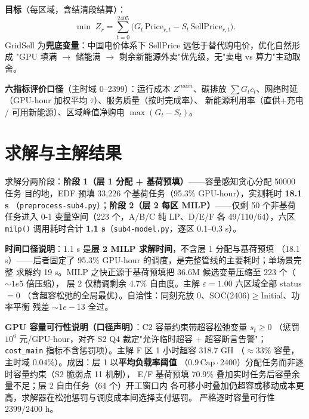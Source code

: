 \documentclass{internal-report}
\begin{document}
\textbf{目标}（每区域，含结清段结算）：
\begin{equation}
  \min\; Z_r = \sum_{t=0}^{2405}\big( G_t\,\text{Price}_{r,t} - S_t\,\text{SellPrice}_{r,t} \big).
  \label{eq:obj}
\end{equation}
GridSell 为\textbf{兜底变量}：中国电价体系下 SellPrice 远低于替代购电价，优化自然形成
"GPU 填满 $\to$ 储能满 $\to$ 剩余新能源外卖"优先级，无"卖电 vs 算力"主动取舍。

\textbf{六指标评价口径}（主时域 0--2399）：运行成本 $Z^{main}$、碳排放
$\sum G_t c_t$、网络时延（GPU-hour 加权平均 $\bar\tau$）、服务质量（按时完成率）、
新能源利用率（直供+充电 / 可用新能源）、区域峰值净购电 $\max(G_t-S_t)$。

\section{求解与主解结果}

求解分两阶段：\textbf{阶段 1（层 1 分配 + 基荷预填）}——容量感知贪心分配 50000 任务
目的地，EDF 预填 33,226 个基荷任务（95.3\% GPU-hour），实测耗时 \textbf{18.1 s}
（\texttt{preprocess-sub4.py}）；\textbf{阶段 2（层 2 每区 MILP）}——仅剩 50 个非基荷
任务进入 0-1 变量空间（223 个，A/B/C 纯 LP、D/E/F 各 49/110/64），六区 \texttt{milp()}
调用耗时合计 \textbf{1.1 s}（\texttt{sub4-model.py}，逐区 0.1--0.3 s）。

\textbf{时间口径说明}：1.1 s 是\textbf{层 2 MILP 求解时间}，不含层 1 分配与基荷预填
（18.1 s）——后者固定了 95.3\% GPU-hour 的调度，是完整管线的主要耗时；单场景完整
求解约 19 s。MILP 之快正源于基荷预填把 36.6M 候选变量压缩至 223 个（$\sim 1e5$ 倍压缩），
层 2 仅精调剩余 4.7\% 自由度。主解 $\varepsilon{=}1.00$ 六区域全部 status$=0$
（含超容松弛的全局最优）。自洽性：同刻充放 0、SOC(2406)$\ge$Initial、功率平衡
残差 $\sim 1e{-}13$ 全过。

\textbf{GPU 容量可行性说明（口径声明）}：C2 容量约束带超容松弛变量 $s_t\ge0$
（惩罚 $10^6$ 元/GPU-hour，对齐 S2 Q4 裁定"允许临时超容 + 超容断言告警"；
\texttt{cost\_main} 指标不含惩罚项）。主解 F 区 1 小时超容 318.7 GH
（$\approx 33\%$ 容量，主时域 $0.04\%$）。成因：层 1 以\textbf{平均负载率阈值}
（$0.9\,\text{Cap}\cdot2400$）分配任务而非逐时容量约束（S2 脆弱点 11 机制），
E/F 基荷预填 70.9\% 叠加实时任务后容量余量不足；层 2 自由任务（64 个）开工窗口内
各可移小时叠加仍超容或移动成本更高，求解器在松弛惩罚与调度成本间选择支付惩罚。
严格逐时容量可行性 $2399/2400$ h。
\end{document}
